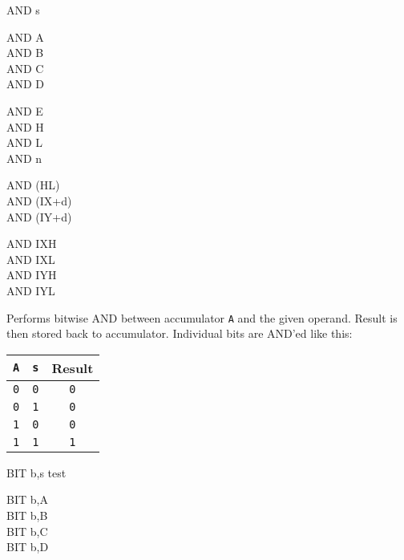 \documentclass[12pt,twoside,openright,a4paper]{book}
\begin{document}
\begin{basedescript}{
	\desclabelstyle{\multilinelabel}
	\desclabelwidth{3cm}}
\begin{DetailItem}{AND s}
		\begin{DetailVariants}[4]
			AND A\\
			AND B\\
			AND C\\
			AND D

			\columnbreak
			AND E\\
			AND H\\
			AND L\\
			AND n
			
			\columnbreak
			AND (HL)\\
			AND (IX+d)\\
			AND (IY+d)

			\columnbreak
			AND IXH\UNDOC\\
			AND IXL\UNDOC\\
			AND IYH\UNDOC\\
			AND IYL\UNDOC
		\end{DetailVariants}

		Performs bitwise AND between accumulator {\tt A} and the given operand. Result is then stored back to accumulator. Individual bits are AND'ed like this:

		\begin{tabular}{cc|c}
			{\tt A} & {\tt s} & Result \\
			\hline
			{\tt 0} & {\tt 0} & {\tt 0} \\
			{\tt 0} & {\tt 1} & {\tt 0} \\
			{\tt 1} & {\tt 0} & {\tt 0} \\
			{\tt 1} & {\tt 1} & {\tt 1} \\
		\end{tabular}

		\begin{DetailEffects}[v]
			\FlagsANDr
		\end{DetailEffects}

		\begin{DetailTiming}
		\end{DetailTiming}

	\end{DetailItem}

	\pagebreak
	\begin{DetailItem}{BIT b,s}
		{test }
		{}

		\begin{DetailVariants}
			BIT b,A\\
			BIT b,B\\
			BIT b,C\\
			BIT b,D


\end{DetailVariants}
\end{DetailItem}
\end{basedescript}
\end{document}
